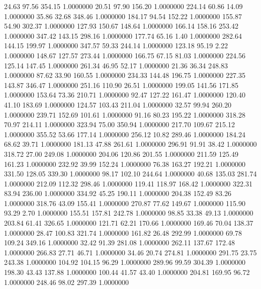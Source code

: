   24.63   97.56  354.15   1.0000000
  20.51   97.90  156.20   1.0000000
 224.14   60.86   14.09   1.0000000
  35.86   32.68  348.46   1.0000000
 184.17   94.54  152.22   1.0000000
 155.87   54.90  302.37   1.0000000
 127.93  150.67  148.64   1.0000000
 166.14  158.16  253.42   1.0000000
 347.42  143.15  298.16   1.0000000
 177.74   65.16    1.40   1.0000000
 282.64  144.15  199.97   1.0000000
 347.57   59.33  244.14   1.0000000
 123.18   95.19    2.22   1.0000000
 148.67  127.57  273.44   1.0000000
 166.75   67.15   81.03   1.0000000
 224.56  125.14  147.45   1.0000000
 261.34   46.95   52.17   1.0000000
  21.36   36.34  248.83   1.0000000
  87.62   33.90  160.55   1.0000000
 234.33  144.48  196.75   1.0000000
 227.35  143.87  346.47   1.0000000
 251.16  110.90   26.51   1.0000000
 199.05  141.56  171.85   1.0000000
 153.64   73.36  210.71   1.0000000
  92.47  127.22  161.47   1.0000000
 120.40   41.10  183.69   1.0000000
 124.57  103.43  211.04   1.0000000
  32.57   99.94  260.20   1.0000000
 239.71  152.69  101.61   1.0000000
  91.16   80.23  195.22   1.0000000
 318.28   70.97  214.11   1.0000000
 323.94   75.00  350.94   1.0000000
 217.70  109.67  215.12   1.0000000
 355.52   53.66  177.14   1.0000000
 256.12   10.82  289.46   1.0000000
 184.24   68.62   39.71   1.0000000
 181.13   47.88  261.61   1.0000000
 296.91   91.91   38.42   1.0000000
 318.72   27.00  249.08   1.0000000
 204.06  120.86  201.55   1.0000000
 211.59  125.49  161.23   1.0000000
 232.92   39.99  152.24   1.0000000
  76.38  163.27  192.21   1.0000000
 331.50  128.05  339.30   1.0000000
  98.17  102.10  244.64   1.0000000
  40.68  135.03  281.74   1.0000000
 212.09  112.32  298.46   1.0000000
 119.41  118.97  168.42   1.0000000
 322.31   83.94  236.00   1.0000000
 334.92   45.25  190.11   1.0000000
 204.38  152.49   83.26   1.0000000
 318.76   43.09  155.41   1.0000000
 270.87   77.62  149.67   1.0000000
 115.90   93.29    2.70   1.0000000
 155.51  157.81  242.78   1.0000000
  98.85   33.38   49.13   1.0000000
 203.84   61.41  326.65   1.0000000
 121.71   62.21  170.66   1.0000000
 169.46   70.04  138.37   1.0000000
  28.47  100.83  321.74   1.0000000
 161.82   26.48  292.99   1.0000000
  69.78  109.24  349.16   1.0000000
  32.42   91.39  281.08   1.0000000
 262.11  137.67  172.48   1.0000000
 266.83   27.71   46.71   1.0000000
  34.46   20.74  274.81   1.0000000
 291.75   23.75  243.38   1.0000000
 104.92  104.15   96.29   1.0000000
 289.96   99.59  304.39   1.0000000
 198.30   43.43  137.88   1.0000000
 100.44   41.57   43.40   1.0000000
 204.81  169.95   96.72   1.0000000
 248.46   98.02  297.39   1.0000000
